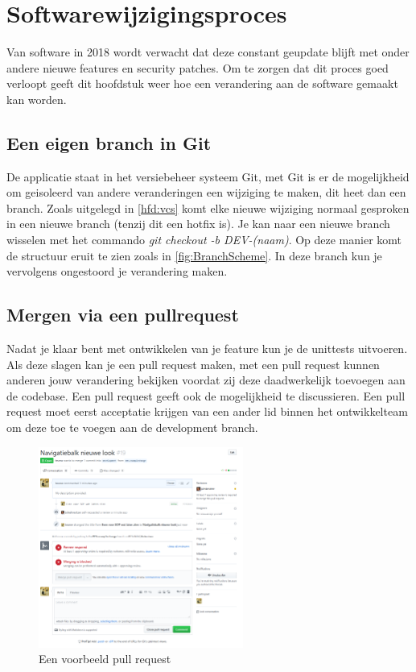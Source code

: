 \chapter{Softwarewijzigingsproces}
Van software in 2018 wordt verwacht dat deze constant geupdate blijft met onder andere nieuwe features en security patches.
Om te zorgen dat dit proces goed verloopt geeft dit hoofdstuk weer hoe een verandering aan de software gemaakt kan worden.

\section{Een eigen branch in Git}
De applicatie staat in het versiebeheer systeem Git, met Git is er de mogelijkheid om geisoleerd van andere veranderingen een wijziging te maken, dit heet dan een branch. 
Zoals uitgelegd in \cref{hfd:vcs} komt elke nieuwe wijziging normaal gesproken in een nieuwe branch (tenzij dit een hotfix is).
Je kan naar een nieuwe branch wisselen met het commando \textit{git checkout -b DEV-(naam)}.
Op deze manier komt de structuur eruit te zien zoals in \cref{fig:BranchScheme}.
In deze branch kun je vervolgens ongestoord je verandering maken.

\section{Mergen via een pullrequest}
Nadat je klaar bent met ontwikkelen van je feature kun je de unittests uitvoeren.
Als deze slagen kan je een pull request maken, met een pull request kunnen anderen jouw verandering bekijken voordat zij deze daadwerkelijk toevoegen aan de codebase.
Een pull request geeft ook de mogelijkheid te discussieren.
Een pull request moet eerst acceptatie krijgen van een ander lid binnen het ontwikkelteam om deze toe te voegen aan de development branch.
\begin{figure}[h]
	\centering\includegraphics[width=0.6\textwidth]{images/PullRequestExample.png}
	\caption{Een voorbeeld pull request}
\end{figure}

